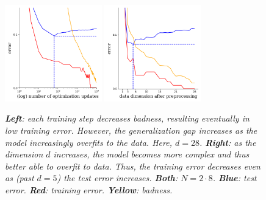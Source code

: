 \documentclass[openany, notitlepage, justified]{tufte-book}
\begin{document}
            \begin{figure}[h]
                \centering
                \includegraphics[height=4.2cm]{yoyo-28-0008}
                \includegraphics[height=4.2cm]{yoyoyo-0008}
                \caption{\emph{
                    \textbf{Left}: 
                    each training step decreases badness, resulting eventually
                    in low training error.  However, the generalization gap 
                    increases as the model increasingly overfits to the data.
                    Here, $d=28$.
                    \textbf{Right}: 
                    as the dimension $d$ increases, the model becomes more
                    complex and thus better able to overfit to data.  Thus, the
                    training error decreases even as (past $d=5$) the test
                    error increases.
                    \textbf{Both}:  
                    $N=2\cdot 8$.
                    \textbf{Blue}:   test error.
                    \textbf{Red}:    training error.
                    \textbf{Yellow}: badness.
                }}
            \end{figure}


\end{document}
